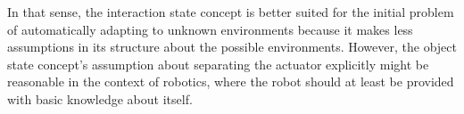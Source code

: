In that sense, the interaction state concept is better suited for the initial problem of automatically adapting to unknown environments because it makes less assumptions in its structure about the possible environments. 
However, the object state concept's assumption about separating the actuator explicitly might be reasonable in the context of robotics, where the robot should at least be provided with basic knowledge about itself. 



